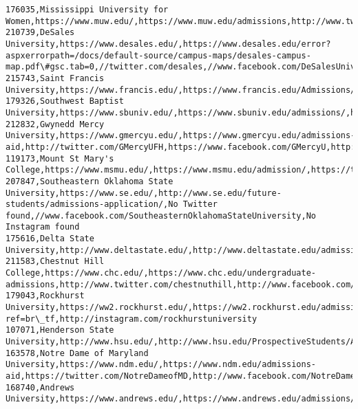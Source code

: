 \documentclass[11pt]{article}
\begin{document}
\begin{Verbatim}[commandchars=\\\{\}]
176035,Mississippi University for Women,https://www.muw.edu/,https://www.muw.edu/admissions,http://www.twitter.com/muwedu,http://www.facebook.com/muwedu,http://instagram.com/muwedu
210739,DeSales University,https://www.desales.edu/,https://www.desales.edu/error?aspxerrorpath=/docs/default-source/campus-maps/desales-campus-map.pdf\#gsc.tab=0,//twitter.com/desales,//www.facebook.com/DeSalesUniversity,//www.instagram.com/desalesuniversity
215743,Saint Francis University,https://www.francis.edu/,https://www.francis.edu/Admissions/,https://twitter.com/SaintFrancisPA,https://www.facebook.com/SaintFrancisUniversity/,http://instagram.com/SaintFrancisPA
179326,Southwest Baptist University,https://www.sbuniv.edu/,https://www.sbuniv.edu/admissions/,https://twitter.com/SBUniv,https://www.facebook.com/SBUniv,https://instagram.com/sbuniv/
212832,Gwynedd Mercy University,https://www.gmercyu.edu/,https://www.gmercyu.edu/admissions-aid,http://twitter.com/GMercyUFH,https://www.facebook.com/GMercyU,http://instagram.com/gmercyu
119173,Mount St Mary's College,https://www.msmu.edu/,https://www.msmu.edu/admission/,https://twitter.com/msmu\_la,https://www.facebook.com/MountSaintMarysU,https://instagram.com/msmu\_la/
207847,Southeastern Oklahoma State University,https://www.se.edu/,http://www.se.edu/future-students/admissions-application/,No Twitter found,//www.facebook.com/SoutheasternOklahomaStateUniversity,No Instagram found
175616,Delta State University,http://www.deltastate.edu/,http://www.deltastate.edu/admissions/,https://twitter.com/deltastate,https://www.facebook.com/deltastateuniversity,https://instagram.com/deltastateuniversity/
211583,Chestnut Hill College,https://www.chc.edu/,https://www.chc.edu/undergraduate-admissions,http://www.twitter.com/chestnuthill,http://www.facebook.com/chestnuthillcollege,https://instagram.com/chestnut\_hill\_college/
179043,Rockhurst University,https://ww2.rockhurst.edu/,https://ww2.rockhurst.edu/admissions,https://twitter.com/RockhurstU,https://www.facebook.com/RockhurstU?ref=br\_tf,http://instagram.com/rockhurstuniversity
107071,Henderson State University,http://www.hsu.edu/,http://www.hsu.edu/ProspectiveStudents/Admissions/index.html,https://twitter.com/hendersonstateu,https://www.facebook.com/HendersonStateU,http://instagram.com/HendersonStateU
163578,Notre Dame of Maryland University,https://www.ndm.edu/,https://www.ndm.edu/admissions-aid,https://twitter.com/NotreDameofMD,http://www.facebook.com/NotreDameOfMaryland,https://instagram.com/notredameofmd
168740,Andrews University,https://www.andrews.edu/,https://www.andrews.edu/admissions/,https://twitter.com/andrewsuniv,https://www.facebook.com/andrewsuniversity,https://instagram.com/andrews\_university/

\end{Verbatim}
\end{document}
